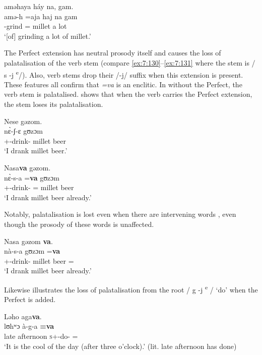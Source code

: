       \medskip
aməhaya  háy  na,  gam.\\
\gll amə-h  =aja haj na gam\\
     {\DEP}-grind  ={\PLU}  millet  {\PSP}    {a lot}\\
\glt  ‘[of] grinding a lot of millet.’\\
\z 

The Perfect extension has neutral prosody itself and causes the loss of palatalisation of the verb stem (compare \ref{ex:7:130}--\ref{ex:7:131} where the stem is / s -j \textsuperscript{e}/).  Also, verb stems drop their /-j/ suffix when this extension is present. These features all confirm that \textit{=va} is an enclitic. In  without the Perfect, the verb stem is palatalised.  shows that when the verb carries the Perfect extension, the stem loses its palatalisation. 

\ea\label{ex:7:130}
Nese  gəzom.\\
\gll  n\`ɛ-ʃ{}-ɛ       gʊzɔm\\
      {\oneS}+{\PFV}-drink-{\CL}    {millet beer}\\
\glt  ‘I drank millet beer.’\\
\z 

\ea\label{ex:7:131}
Nasa\textbf{va} gəzom.\\
\gll  n\`ɛ{}-s{}-a       =\textbf{va}  gʊzɔm\\
      {\oneS}+{\PFV}-drink-{\CL}  ={\PRF}  {millet beer}\\
\glt  ‘I drank millet beer already.’\\
\z 

Notably, palatalisation is lost even when there are intervening words , even though the prosody of these words is unaffected. 

\ea\label{ex:7:132}
Nasa  gəzom  \textbf{va}.\\
\gll  nà{}-s-a      gʊzɔm    =\textbf{va}\\
      {\oneS}+{\PFV}-drink-{\CL}    {millet beer}  ={\PRF}\\
\glt  ‘I drank millet beer already.’\\
\z 

Likewise  illustrates the loss of palatalisation from the root / g -j\textsuperscript{ e}\textit{ }/ ‘do’ when the Perfect is added. 

\clearpage
\ea\label{ex:7:133}
Ləho  aga\textbf{va}.\\
\gll  lʊhʷɔ    à-g-a \textbf{=va}\\
      {late afternoon}  \textsc{s}+{\PFV}-do-{\CL} ={\PRF}\\
\glt  ‘It is the cool of the day (after three o’clock).’ (lit. late afternoon has done)\\
\z  

